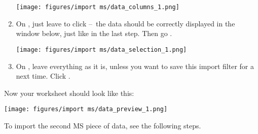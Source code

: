 \documentclass[a4paper, 11pt, raggedright, parskip, sans, colorful]{tufte-style-article}
\begin{document}
\begin{enumerate}
\texttt{[image: figures/import ms/data\_columns\_1.png]}

\item On , just leave  to  click  --~the data should be correctly displayed in the window below, just like in the last step. Then go .

\texttt{[image: figures/import ms/data\_selection\_1.png]}

\item On , leave everything as it is, unless you want to save this import filter for a next time. Click .

\end{enumerate}

Now your worksheet should look like this:

\texttt{[image: figures/import ms/data\_preview\_1.png]}

To import the second MS piece of data, see the following steps.
\end{document}
